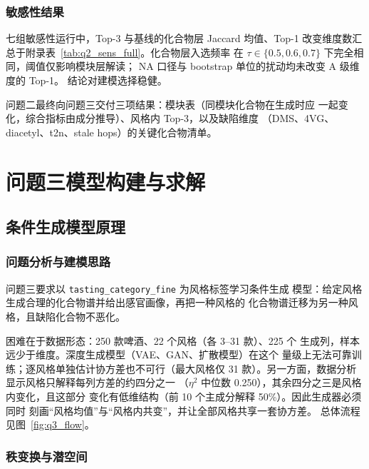 \documentclass[12pt,a4paper]{article}
\begin{document}
\subsubsection{敏感性结果}

七组敏感性运行中，Top-3 与基线的化合物层 Jaccard 均值、Top-1
改变维度数汇总于附录表~\ref{tab:q2_sens_full}。化合物层入选频率
在 $\tau\in\{0.5,0.6,0.7\}$ 下完全相同，阈值仅影响模块层解读；
NA 口径与 bootstrap 单位的扰动均未改变 A 级维度的 Top-1。
结论对建模选择稳健。

问题二最终向问题三交付三项结果：模块表（同模块化合物在生成时应
一起变化，综合指标由成分推导）、风格内 Top-3，以及缺陷维度
（DMS、4VG、diacetyl、t2n、stale hops）的关键化合物清单。
\section{问题三模型构建与求解}

\subsection{条件生成模型原理}

\subsubsection{问题分析与建模思路}

问题三要求以 \verb|tasting_category_fine| 为风格标签学习条件生成
模型：给定风格生成合理的化合物谱并给出感官画像，再把一种风格的
化合物谱迁移为另一种风格，且缺陷化合物不恶化。

困难在于数据形态：250 款啤酒、22 个风格（各 3--31 款）、225 个
生成列，样本远少于维度。深度生成模型（VAE、GAN、扩散模型）在这个
量级上无法可靠训练；逐风格单独估计协方差也不可行（最大风格仅 31
款）。另一方面，数据分析显示风格只解释每列方差的约四分之一
（$\eta^2$ 中位数 0.250），其余四分之三是风格内变化，且这部分
变化有低维结构（前 10 个主成分解释 50\%）。因此生成器必须同时
刻画``风格均值''与``风格内共变''，并让全部风格共享一套协方差。
总体流程见图~\ref{fig:q3_flow}。


\subsubsection{秩变换与潜空间}
\end{document}
